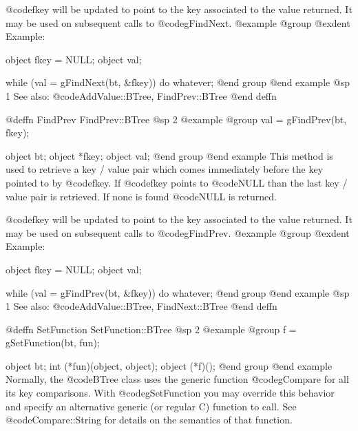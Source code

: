 @code{fkey} will be updated to point to the key associated to the value
returned.  It may be used on subsequent calls to @code{gFindNext}.
@example
@group
@exdent Example:

object  fkey = NULL;
object  val;

while (val = gFindNext(bt, &fkey))
     do whatever;
@end group
@end example
@sp 1
See also:  @code{AddValue::BTree, FindPrev::BTree}
@end deffn





















@deffn {FindPrev} FindPrev::BTree
@sp 2
@example
@group
val = gFindPrev(bt, fkey);

object  bt;
object  *fkey;
object  val;
@end group
@end example
This method is used to retrieve a key / value pair which comes
immediately before the key pointed to by @code{fkey}.  If @code{fkey}
points to @code{NULL} than the last key / value pair is retrieved.  If
none is found @code{NULL} is returned.

@code{fkey} will be updated to point to the key associated to the value
returned.  It may be used on subsequent calls to @code{gFindPrev}.
@example
@group
@exdent Example:

object  fkey = NULL;
object  val;

while (val = gFindPrev(bt, &fkey))
     do whatever;
@end group
@end example
@sp 1
See also:  @code{AddValue::BTree, FindNext::BTree}
@end deffn














@deffn {SetFunction} SetFunction::BTree
@sp 2
@example
@group
f = gSetFunction(bt, fun);

object  bt;
int     (*fun)(object, object);
object  (*f)();
@end group
@end example
Normally, the @code{BTree} class uses the generic function
@code{gCompare} for all its key comparisons.  With @code{gSetFunction}
you may override this behavior and specify an alternative generic (or
regular C) function to call.  See @code{Compare::String} for details
on the semantics of that function.

